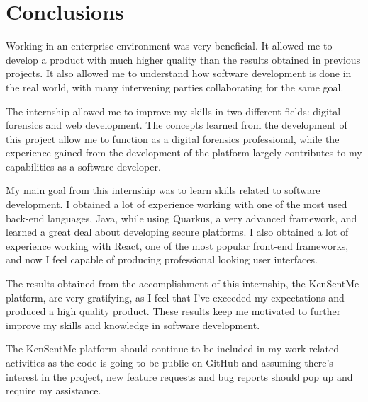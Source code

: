 

\chapter{Conclusions}
\label{ch:conclusion}

Working in an enterprise environment was very beneficial.
It allowed me to develop a product with much higher quality than the results obtained in previous projects.
It also allowed me to understand how software development is done in the real world, with many intervening parties collaborating for the same goal.

The internship allowed me to improve my skills in two different fields: digital forensics and web development.
The concepts learned from the development of this project allow me to function as a digital forensics professional, 
while the experience gained from the development of the platform largely contributes to my capabilities as a software developer.

My main goal from this internship was to learn skills related to software development.
I obtained a lot of experience working with one of the most used back-end languages, Java, while using Quarkus, a very advanced framework,
and learned a great deal about developing secure platforms.
I also obtained a lot of experience working with React, one of the most popular front-end frameworks, and now I feel capable of producing professional looking user interfaces.

The results obtained from the accomplishment of this internship, the KenSentMe platform, are very gratifying, as I feel that I've exceeded my expectations and produced a high quality product.
These results keep me motivated to further improve my skills and knowledge in software development.

The KenSentMe platform should continue to be included in my work related activities as the code is going to be public on GitHub 
and assuming there's interest in the project, new feature requests and bug reports should pop up and require my assistance.
